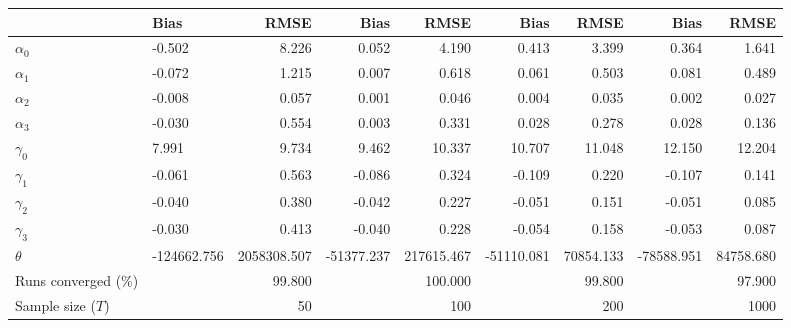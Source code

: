 
\begin{tabular}[t]{llrrrrrrr}
\toprule
  & Bias & RMSE & Bias & RMSE & Bias & RMSE & Bias & RMSE\\
\midrule
$\alpha_{0}$ & -0.502 & 8.226 & 0.052 & 4.190 & 0.413 & 3.399 & 0.364 & 1.641\\
$\alpha_{1}$ & -0.072 & 1.215 & 0.007 & 0.618 & 0.061 & 0.503 & 0.081 & 0.489\\
$\alpha_{2}$ & -0.008 & 0.057 & 0.001 & 0.046 & 0.004 & 0.035 & 0.002 & 0.027\\
$\alpha_{3}$ & -0.030 & 0.554 & 0.003 & 0.331 & 0.028 & 0.278 & 0.028 & 0.136\\
$\gamma_{0}$ & 7.991 & 9.734 & 9.462 & 10.337 & 10.707 & 11.048 & 12.150 & 12.204\\
$\gamma_{1}$ & -0.061 & 0.563 & -0.086 & 0.324 & -0.109 & 0.220 & -0.107 & 0.141\\
$\gamma_{2}$ & -0.040 & 0.380 & -0.042 & 0.227 & -0.051 & 0.151 & -0.051 & 0.085\\
$\gamma_{3}$ & -0.030 & 0.413 & -0.040 & 0.228 & -0.054 & 0.158 & -0.053 & 0.087\\
$\theta$ & -124662.756 & 2058308.507 & -51377.237 & 217615.467 & -51110.081 & 70854.133 & -78588.951 & 84758.680\\
Runs converged (\%) &  & 99.800 &  & 100.000 &  & 99.800 &  & 97.900\\
Sample size ($T$) &  & 50 &  & 100 &  & 200 &  & 1000\\
\bottomrule
\end{tabular}
